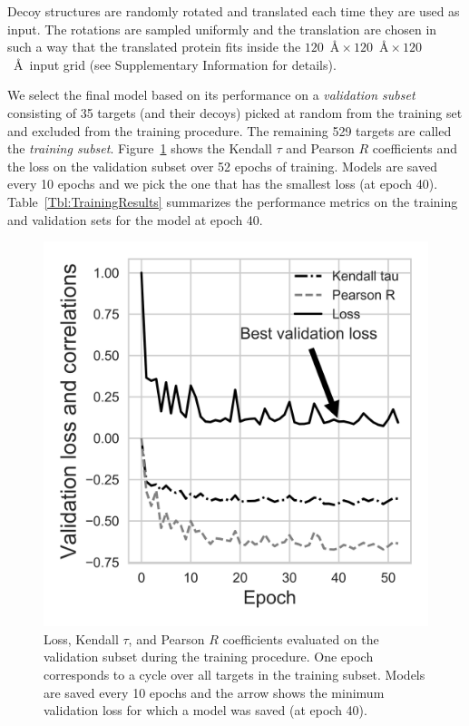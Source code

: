 \documentclass{bioinfo}
\begin{document}
Decoy structures are randomly rotated and translated each time they
are used as input. The rotations are sampled uniformly
\citep{shoemake1992uniform} and the translation are chosen in such a
way that the translated protein fits inside the $120$~\AA${}\times
120$~\AA${}\times 120$~\AA\ input grid (see Supplementary Information for
details).

We select the final model based on its performance on a
\emph{validation subset} consisting of 35 targets (and their decoys)
picked at random from the training set and excluded from the training
procedure. The remaining 529 targets are called the \emph{training
subset}.  Figure~\ref{Fig:TrainingLoss} shows the Kendall $\tau$ and
Pearson $R$ coefficients and the loss on the validation subset over 52
epochs of training.  Models are saved every 10 epochs and we pick the
one that has the smallest loss (at epoch 40).
Table~\ref{Tbl:TrainingResults} summarizes the performance metrics on
the training and validation sets for the model at epoch 40.

\begin{figure}[!tpb]
    \centering
    \includegraphics[width=\linewidth]{image4.png}
    \caption{Loss, Kendall $\tau$, and Pearson $R$ coefficients
      evaluated on the validation subset during the training
      procedure.  One epoch corresponds to a cycle over all targets in
      the training subset. Models are saved every 10 epochs and the
      arrow shows the minimum validation loss for which a model was
      saved (at epoch 40).}
    \label{Fig:TrainingLoss}
\end{figure}
\end{document}
